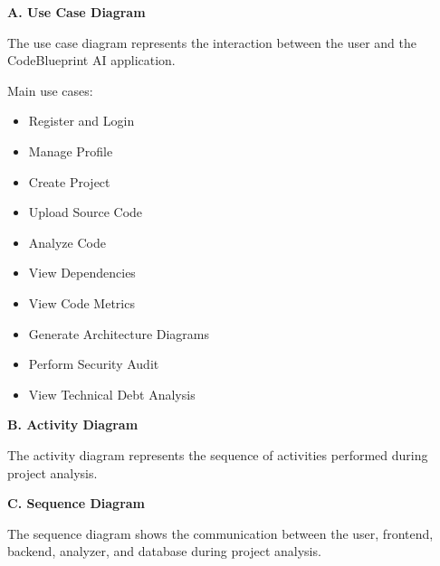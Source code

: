 \documentclass[0pt, a4 paper]{report}
\begin{document}
\begin{center}
{\justify \textbf{A. Use Case Diagram}

\justify The use case diagram represents the interaction between the user and the CodeBlueprint AI application.

\justify Main use cases:
 \begin{itemize}
     \item Register and Login
 \end{itemize}
 \begin{itemize}
     \item Manage Profile
 \end{itemize}
 \begin{itemize}
     \item Create Project
 \end{itemize}
 \begin{itemize}
     \item Upload Source Code
 \end{itemize}
 \begin{itemize}
     \item Analyze Code
 \end{itemize}
\begin{itemize}
    \item View Dependencies
\end{itemize}
 \begin{itemize}
     \item View Code Metrics
 \end{itemize}
 \begin{itemize}
     \item Generate Architecture Diagrams
 \end{itemize}
 \begin{itemize}
     \item Perform Security Audit
 \end{itemize}
 \begin{itemize}
     \item View Technical Debt Analysis
 \end{itemize}


\justify \textbf{B. Activity Diagram }

 \justify The activity diagram represents the sequence of activities performed during project analysis.

\justify \textbf{C. Sequence Diagram}

\justify The sequence diagram shows the communication between the user, frontend, backend, analyzer, and database during project analysis.


}
\end{center}
\end{document}
